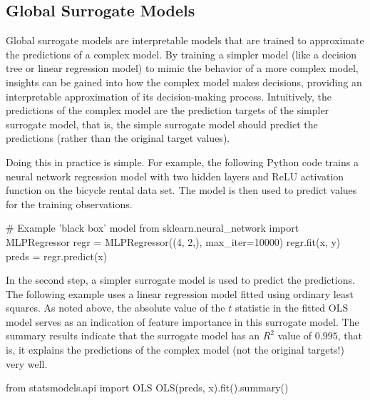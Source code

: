 \subsection{Global Surrogate Models}

Global surrogate models are interpretable models that are trained to approximate the predictions of a complex model. By training a simpler model (like a decision tree or linear regression model) to mimic the behavior of a more complex model, insights can be gained into how the complex model makes decisions, providing an interpretable approximation of its decision-making process. Intuitively, the predictions of the complex model are the prediction targets of the simpler surrogate model, that is, the simple surrogate model should predict the predictions (rather than the original target values).

Doing this in practice is simple. For example, the following Python code trains a neural network regression model with two hidden layers and ReLU activation function on the bicycle rental data set. The model is then used to predict values for the training observations.

\begin{samepage}
\begin{pythoncode}
# Example 'black box' model
from sklearn.neural_network import MLPRegressor
regr = MLPRegressor((4, 2,), max_iter=10000)
regr.fit(x, y)
preds = regr.predict(x)
\end{pythoncode}
\end{samepage}

In the second step, a simpler surrogate model is used to predict the predictions. The following example uses a linear regression model fitted using ordinary least squares. As noted above, the absolute value of the $t$ statistic in the fitted OLS model serves as an indication of feature importance in this surrogate model. The summary results indicate that the surrogate model has an $R^2$ value of $0.995$, that is, it explains the predictions of the complex model (not the original targets!) very well. 

\begin{samepage}
\begin{pythoncode}
from statsmodels.api import OLS
OLS(preds, x).fit().summary()
\end{pythoncode}
\end{samepage}

